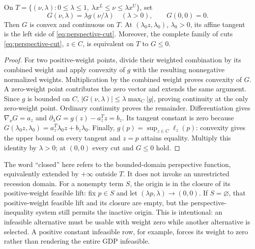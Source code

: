 \begin{proposition}\label{prop:perspective}
On $T=\{(\nu,\lambda):0\le\lambda\le1,\ \lambda x^L\le\nu\le\lambda x^U\}$, set
\[
 G(\nu,\lambda)=\lambda g(\nu/\lambda)\quad(\lambda>0),\qquad G(0,0)=0.
\]
Then $G$ is convex and continuous on $T$. At $(\lambda_0z,\lambda_0)$, $\lambda_0>0$, its affine tangent is the left side of \eqref{eq:perspective-cut}. Moreover, the complete family of cuts \eqref{eq:perspective-cut}, $z\in C$, is equivalent on $T$ to $G\le0$.
\end{proposition}
\begin{proof}
For two positive-weight points, divide their weighted combination by its combined weight and apply convexity of $g$ with the resulting nonnegative normalized weights. Multiplication by the combined weight proves convexity of $G$. A zero-weight point contributes the zero vector and extends the same argument. Since $g$ is bounded on $C$, $|G(\nu,\lambda)|\le\lambda\max_C|g|$, proving continuity at the only zero-weight point. Ordinary continuity proves the remainder. Differentiation gives $\nabla_\nu G=a_z$ and $\partial_\lambda G=g(z)-a_z^Tz=b_z$. Its tangent constant is zero because $G(\lambda_0z,\lambda_0)=a_z^T\lambda_0z+b_z\lambda_0$. Finally, $g(p)=\sup_{z\in C}\ell_z(p)$: convexity gives the upper bound on every tangent and $z=p$ attains equality. Multiply this identity by $\lambda>0$; at $(0,0)$ every cut and $G\le0$ hold.
\end{proof}
The word ``closed'' here refers to the bounded-domain perspective function, equivalently extended by $+\infty$ outside $T$. It does not invoke an unrestricted recession domain. For a nonempty term $S$, the origin is in the closure of its positive-weight feasible lift: fix $p\in S$ and let $(\lambda p,\lambda)\to(0,0)$. If $S=\varnothing$, that positive-weight feasible lift and its closure are empty, but the perspective-inequality system still permits the inactive origin. This is intentional: an infeasible alternative must be usable with weight zero while another alternative is selected. A positive constant infeasible row, for example, forces its weight to zero rather than rendering the entire GDP infeasible.

